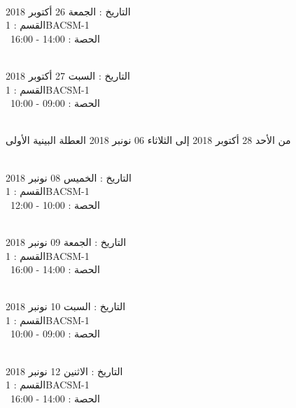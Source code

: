 \documentclass[14pt a4paper twocolumn]{book}
\begin{document}
\noindent\makebox[\linewidth]{\rule{\paperwidth}{0.4pt}}
 \\
التاريخ : الجمعة 26 أكتوبر 2018 \\
القسم : 1BACSM-1 \\
 \  
الحصة : 14:00 - 16:00 \\
\par
\noindent\makebox[\linewidth]{\rule{\paperwidth}{0.4pt}}
 \\
التاريخ : السبت 27 أكتوبر 2018 \\
القسم : 1BACSM-1 \\
 \  
الحصة : 09:00 - 10:00 \\
\par
\noindent\makebox[\linewidth]{\rule{\paperwidth}{0.4pt}}
 \\
من الأحد 28 أكتوبر 2018 إلى الثلاثاء 06 نونبر 2018
\newline
\indent
 العطلة البينية الأولى
\par
\noindent\makebox[\linewidth]{\rule{\paperwidth}{0.4pt}}
 \\
التاريخ : الخميس 08 نونبر 2018 \\
القسم : 1BACSM-1 \\
 \  
الحصة : 10:00 - 12:00 \\
\par
\noindent\makebox[\linewidth]{\rule{\paperwidth}{0.4pt}}
 \\
التاريخ : الجمعة 09 نونبر 2018 \\
القسم : 1BACSM-1 \\
 \  
الحصة : 14:00 - 16:00 \\
\par
\noindent\makebox[\linewidth]{\rule{\paperwidth}{0.4pt}}
 \\
التاريخ : السبت 10 نونبر 2018 \\
القسم : 1BACSM-1 \\
 \  
الحصة : 09:00 - 10:00 \\
\par
\noindent\makebox[\linewidth]{\rule{\paperwidth}{0.4pt}}
 \\
التاريخ : الاثنين 12 نونبر 2018 \\
القسم : 1BACSM-1 \\
 \  
الحصة : 14:00 - 16:00 \\
\end{document}
